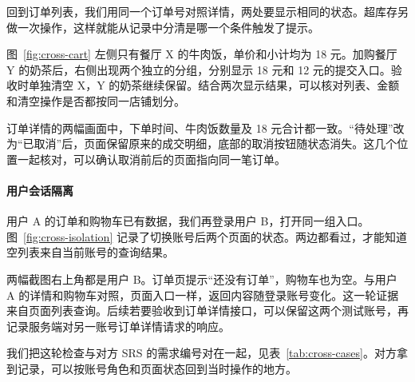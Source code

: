 回到订单列表，我们用同一个订单号对照详情，两处要显示相同的状态。超库存另做一次操作，这样就能从记录中分清是哪一个条件触发了提示。

图~\ref{fig:cross-cart} 左侧只有餐厅 X 的牛肉饭，单价和小计均为 18 元。加购餐厅 Y 的奶茶后，右侧出现两个独立的分组，分别显示 18 元和 12 元的提交入口。验收时单独清空 X，Y 的奶茶继续保留。结合两次显示结果，可以核对列表、金额和清空操作是否都按同一店铺划分。


订单详情的两幅画面中，下单时间、牛肉饭数量及 18 元合计都一致。“待处理”改为“已取消”后，页面保留原来的成交明细，底部的取消按钮随状态消失。这几个位置一起核对，可以确认取消前后的页面指向同一笔订单。


\clearpage
\paragraph{用户会话隔离}
用户 A 的订单和购物车已有数据，我们再登录用户 B，打开同一组入口。图~\ref{fig:cross-isolation} 记录了切换账号后两个页面的状态。两边都看过，才能知道空列表来自当前账号的查询结果。


两幅截图右上角都是用户 B。订单页提示“还没有订单”，购物车也为空。与用户 A 的详情和购物车对照，页面入口一样，返回内容随登录账号变化。这一轮证据来自页面列表查询。后续若要验收到订单详情接口，可以保留这两个测试账号，再记录服务端对另一账号订单详情请求的响应。

我们把这轮检查与对方 SRS 的需求编号对在一起，见表~\ref{tab:cross-cases}。对方拿到记录，可以按账号角色和页面状态回到当时操作的地方。

